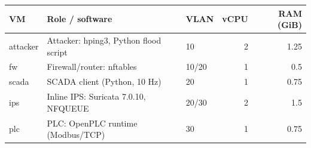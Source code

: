 \begin{tabular}{lllrr}
\toprule
VM & Role / software & VLAN & vCPU & RAM (GiB)\\
\midrule
attacker & Attacker: hping3, Python flood script & 10 & 2 & 1.25\\
fw & Firewall/router: nftables & 10/20 & 1 & 0.5\\
scada & SCADA client (Python, 10 Hz) & 20 & 1 & 0.75\\
ips & Inline IPS: Suricata 7.0.10, NFQUEUE & 20/30 & 2 & 1.5\\
plc & PLC: OpenPLC runtime (Modbus/TCP) & 30 & 1 & 0.75\\
\bottomrule
\end{tabular}
